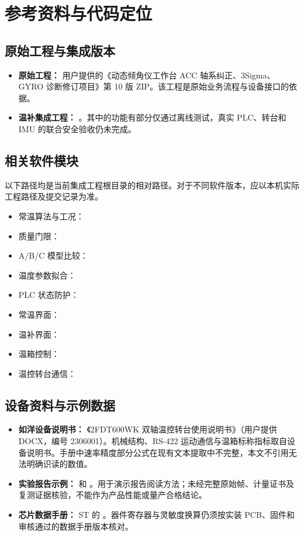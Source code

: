 \chapter{参考资料与代码定位}

\section{原始工程与集成版本}
\begin{itemize}
\item \textbf{原始工程：} 用户提供的《动态倾角仪工作台 ACC 轴系纠正、3Sigma、GYRO 诊断修订项目》第 10 版 ZIP。该工程是原始业务流程与设备接口的依据。
\item \textbf{温补集成工程：} 。其中的功能有部分仅通过离线测试，真实 PLC、转台和 IMU 的联合安全验收仍未完成。
\end{itemize}

\section{相关软件模块}
以下路径均是当前集成工程根目录的相对路径。对于不同软件版本，应以本机实际工程路径及提交记录为准。
\begin{itemize}[itemsep=2pt]
\item 常温算法与工况：
\item 质量门限：
\item A/B/C 模型比较：
\item 温度参数拟合：
\item PLC 状态防护：
\item 常温界面：
\item 温补界面：
\item 温箱控制：
\item 温控转台通信：
\end{itemize}

\section{设备资料与示例数据}
\begin{itemize}
\item \textbf{如洋设备说明书：} 《2FDT600WK 双轴温控转台使用说明书》（用户提供 DOCX，编号 2306001）。机械结构、RS-422 运动通信与温箱标称指标取自设备说明书。手册中速率精度部分公式在现有文本提取中不完整，本文不引用无法明确识读的数值。
\item \textbf{实验报告示例：}  和 。用于演示报告阅读方法；未经完整原始帧、计量证书及复测证据核验，不能作为产品性能或量产合格结论。
\item \textbf{芯片数据手册：} ST 的 。器件寄存器与灵敏度换算仍须按实装 PCB、固件和审核通过的数据手册版本核对。
\end{itemize}
